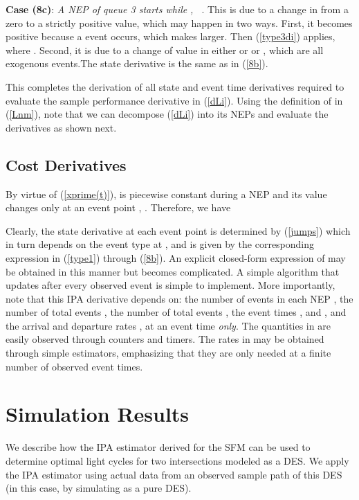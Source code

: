 \documentclass{ifacconf}\usepackage{graphicx}
\begin{document}
\textbf{Case (8c)}: \emph{A NEP of queue 3 starts while }\emph{, \ }. This is due to a change in  from a zero to a strictly positive value,
which may happen in two ways. First, it becomes positive because a 
event occurs, which makes  larger. Then (\ref{type3di})
applies, where . Second, it is due to a
change of value in either  or  or
, which are all exogenous events.The state derivative is
the same as in (\ref{8b}).

This completes the derivation of all state and event time derivatives required
to evaluate the sample performance derivative in (\ref{dLi}). Using the
definition of  in (\ref{Lnm}), note that we can decompose
(\ref{dLi}) into its NEPs and evaluate the derivatives  as shown next.

\subsection{Cost Derivatives}

By virtue of (\ref{xprime(t)}),  is piecewise constant
during a NEP and its value changes only at an event point ,
. Therefore, we have

Clearly, the state derivative at each event point is determined by
(\ref{jumps}) which in turn depends on the event type at ,
 and is given by the corresponding expression in
(\ref{type1}) through (\ref{8b}). An explicit closed-form expression of
 may be obtained in this manner but becomes
complicated. A simple algorithm that updates  after every observed event is simple to implement. More
importantly, note that this IPA derivative depends on:  the number of
events in each NEP ,  the number of total  events
,  the number of total  events ,
 the event times ,  and , and 
the arrival and departure rates , 
at an event time \emph{only}. The quantities in  are easily observed
through counters and timers. The rates in  may be obtained through simple
estimators, emphasizing that they are only needed at a finite number of
observed event times.

\section{Simulation Results}


We describe how the IPA estimator derived for the SFM can be used to determine
optimal light cycles for two intersections modeled as a DES. We apply the IPA
estimator using actual data from an observed sample path of this DES (in this
case, by simulating as a pure DES).
\end{document}
